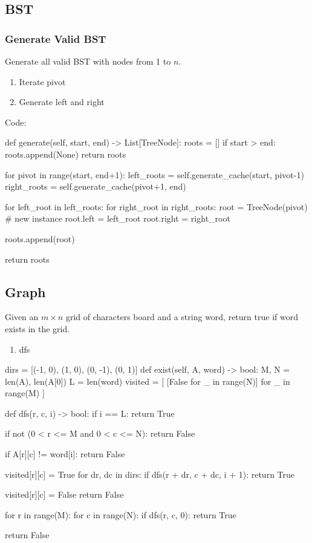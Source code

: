 \subsection{BST}
\subsubsection{Generate Valid BST}
Generate all valid BST with nodes from 1 to $n$.
\begin{enumerate}
\item Iterate pivot
\item Generate left and right
\end{enumerate}
Code:
\begin{python}
def generate(self, start, end) -> List[TreeNode]:
  roots = []
  if start > end:
    roots.append(None)
    return roots

  for pivot in range(start, end+1):
    left_roots = self.generate_cache(start, pivot-1)
    right_roots = self.generate_cache(pivot+1, end)
    
    for left_root in left_roots:
      for right_root in right_roots:
        root = TreeNode(pivot)  # new instance
        root.left = left_root
        root.right = right_root

        roots.append(root)

  return roots 
\end{python}
\subsection{Graph}
 Given an $m \times n$ grid of characters board and a string word, return true if word exists in the grid.
\begin{enumerate}
\item dfs
\end{enumerate}
\begin{python}
dirs = [(-1, 0), (1, 0), (0, -1), (0, 1)]
def exist(self, A, word) -> bool:
  M, N = len(A), len(A[0])
  L = len(word)
  visited = [
    [False for _ in range(N)]
    for _ in range(M)
  ]

  def dfs(r, c, i) -> bool:
    if i == L:
      return True
        
    if not (0 < r <= M and 0 < c <= N):
      return False

    if A[r][c] != word[i]:
      return False

    visited[r][c] = True
    for dr, dc in dirs:
      if dfs(r + dr, c + dc, i + 1):
        return True
      
    visited[r][c] = False
    return False

  for r in range(M):
    for c in range(N):
      if dfs(r, c, 0):
        return True
      
  return False
\end{python}



